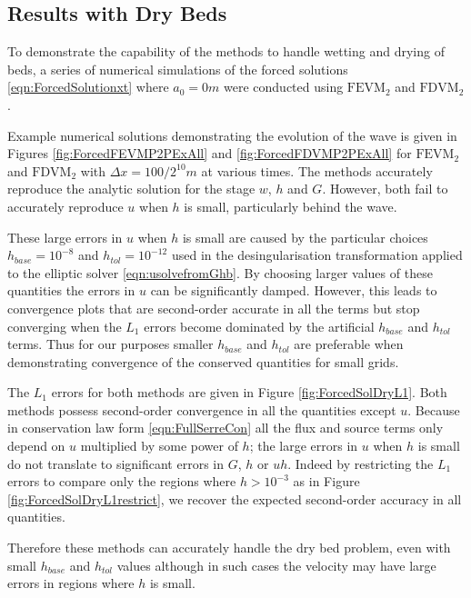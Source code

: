 \subsection{Results with Dry Beds} 
To demonstrate the capability of the methods to handle wetting and drying of beds, a series of numerical simulations of the forced solutions \eqref{eqn:ForcedSolutionxt} where $a_0 = 0m$ were conducted using $\text{FEVM}_2$ and $\text{FDVM}_2$. 

Example numerical solutions demonstrating the evolution of the wave is given in Figures \ref{fig:ForcedFEVMP2PExAll} and \ref{fig:ForcedFDVMP2PExAll} for $\text{FEVM}_2$ and $\text{FDVM}_2$ with $\Delta x = 100/ 2^{10} m$ at various times. The methods accurately reproduce the analytic solution for the stage $w$, $h$ and $G$. However, both fail to accurately reproduce $u$ when $h$ is small, particularly behind the wave.

These large errors in $u$ when $h$ is small are caused by the particular choices $h_{{base}} = 10^{-8}$ and $h_{{tol}}  = 10^{-12}$ used in the desingularisation transformation applied to the elliptic solver \eqref{eqn:usolvefromGhb}. By choosing larger values of these quantities the errors in $u$ can be significantly damped. However, this leads to convergence plots that are second-order accurate in all the terms but stop converging when the $L_1$ errors become dominated by the artificial $h_{{base}}$ and $h_{{tol}}$ terms. Thus for our purposes smaller $h_{{base}}$ and $h_{{tol}}$ are preferable when demonstrating convergence of the conserved quantities for small grids.

The $L_1$ errors for both methods are given in Figure \ref{fig:ForcedSolDryL1}. Both methods possess second-order convergence in all the quantities except $u$. Because in conservation law form \eqref{eqn:FullSerreCon} all the flux and source terms only depend on $u$ multiplied by some power of $h$; the large errors in $u$ when $h$ is small do not translate to significant errors in $G$, $h$ or $uh$. Indeed by restricting the $L_1$ errors to compare only the regions where $h > 10^{-3}$ as in Figure \ref{fig:ForcedSolDryL1restrict}, we recover the expected second-order accuracy in all quantities.

Therefore these methods can accurately handle the dry bed problem, even with small $h_{{base}}$ and $h_{{tol}}$ values although in such cases the velocity may have large errors in regions where $h$ is small. 


